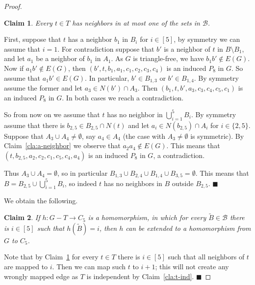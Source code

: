 \documentclass[11pt,a4paper]{article}
\theoremstyle{mystyle}
\newtheorem{claim}{Claim}[theorem]
\newenvironment{claimproof}{\noindent {\emph{Proof of Claim.}}}{\hfill$\blacksquare$\medskip}
\newcommand{\cB}{\mathcal{B}}
\begin{document}
\begin{proof}


\begin{claim}\label{cla:t-neighbors}
Every $t \in T$ has neighbors in at most one of the sets in $\cB$.
\end{claim}
\begin{claimproof}
First, suppose that $t$ has a neighbor $b_1$ in $B_i$ for $i \in [5]$, by symmetry we can assume that $i=1$.
For contradiction suppose that $b'$ is a neighbor of $t$ in $B \setminus B_1$, and let $a_1$ be a neighbor of $b_1$ in $A_1$.
As $G$ is triangle-free, we have $b_1b' \notin E(G)$.
Now if $a_1b' \notin E(G)$, then $(b',t,b_1,a_1,c_1,c_2,c_3,c_4)$ is an induced $P_8$ in $G$.
So assume that $a_1b' \in E(G)$. In particular, $b' \in B_{1,3}$ or $b' \in B_{1,4}$. By symmetry assume the former and let $a_3 \in N(b') \cap A_3$.
Then $(b_1,t,b',a_3,c_3,c_4,c_5,c_1)$ is an induced $P_8$ in $G$. In both cases we reach a contradiction.

So from now on we assume that $t$ has no neighbor in $\bigcup_{i=1}^5 B_i$.
By symmetry assume that there is $b_{2,5} \in B_{2,5} \cap N(t)$ and let $a_i \in N(b_{2,5}) \cap A_i$ for $i \in \{2,5\}$.
Suppose that $A_3 \cup A_4 \neq \emptyset$, say $a_4 \in A_4$ (the case with $A_3 \neq \emptyset$ is symmetric).
By Claim~\ref{cla:a-neighbor} we observe that $a_2a_4 \notin E(G)$.
This means that $(t,b_{2,5},a_2,c_2,c_1,c_5,c_4,a_4)$ is an induced $P_8$ in $G$, a contradiction.

Thus $A_3 \cup A_4 = \emptyset$, so in particular $B_{1,3} \cup B_{2,4} \cup B_{1,4} \cup B_{3,5} = \emptyset$.
This means that $B = B_{2,5} \cup \bigcup_{i=1}^5 B_i$, so indeed $t$ has no neighbors in $B$ outside $B_{2,5}$.
\end{claimproof}

We obtain the following.
\begin{claim}\label{cla:t-homo}
If $h:G - T \to C_5$ is a homomorphism, in which for every $\widetilde{B} \in \cB$ there is $i \in [5]$
such that $h(\widetilde{B}) = i$,
then $h$ can be extended to a homomorphism  from $G$ to $C_5$.
\end{claim}
\begin{claimproof}
Note that by Claim~\ref{cla:t-neighbors} for every $t \in T$ there is $i \in [5]$ such that all neighbors of $t$ are mapped to $i$. Then we can map such $t$ to $i+1$; this will not create any wrongly mapped edge as $T$ is independent by Claim~\ref{cla:t-ind}.
\end{claimproof}



\end{proof}
\end{document}
